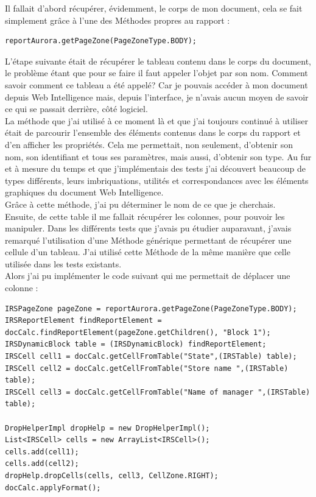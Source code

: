 Il fallait d'abord r\'{e}cup\'{e}rer, \'{e}videmment, le corps de mon document, cela se fait simplement gr\^{a}ce \`{a} l'une des M\'{e}thodes propres au rapport :
\begin{lstlisting}
reportAurora.getPageZone(PageZoneType.BODY);
\end{lstlisting}
L'\'{e}tape suivante \'{e}tait de r\'{e}cup\'{e}rer le tableau contenu dans le corps du document, le probl\`{e}me \'{e}tant que pour se faire il faut appeler l'objet par son nom. Comment savoir comment ce tableau a \'{e}t\'{e} appel\'{e}? Car je pouvais acc\'{e}der \`{a} mon document depuis Web Intelligence mais, depuis l'interface, je n'avais aucun moyen de savoir ce qui se passait derri\`{e}re, c\^{o}t\'{e} logiciel.\\
La m\'{e}thode que j'ai utilis\'{e} \`{a} ce moment l\`{a} et que j'ai toujours continu\'{e} \`{a} utiliser \'{e}tait de parcourir l'ensemble des \'{e}l\'{e}ments contenus dans le corps du rapport et d'en afficher les propri\'{e}t\'{e}s. Cela me permettait, non seulement, d'obtenir son nom, son identifiant et tous ses param\`{e}tres, mais aussi, d'obtenir son type. Au fur et \`{a} mesure du temps et que j'impl\'{e}mentais des tests j'ai d\'{e}couvert beaucoup de types diff\'{e}rents, leurs imbriquations, utilit\'{e}s et correspondances avec les \'{e}l\'{e}ments graphiques du document Web Intelligence.\\
Gr\^{a}ce \`{a} cette m\'{e}thode, j'ai pu d\'{e}terminer le nom de ce que je cherchais.\\
Ensuite, de cette table il me fallait r\'{e}cup\'{e}rer les colonnes, pour pouvoir les manipuler. Dans les diff\'{e}rents tests que j'avais pu \'{e}tudier auparavant, j'avais remarqu\'{e} l'utilisation d'une M\'{e}thode g\'{e}n\'{e}rique permettant de r\'{e}cup\'{e}rer une cellule d'un tableau. J'ai utilis\'{e} cette M\'{e}thode de la m\^{e}me mani\`{e}re que celle utilis\'{e}e dans les tests existants. \\
Alors j'ai pu impl\'{e}menter le code suivant qui me permettait de d\'{e}placer une colonne :


\begin{lstlisting}
IRSPageZone pageZone = reportAurora.getPageZone(PageZoneType.BODY);
IRSReportElement findReportElement = docCalc.findReportElement(pageZone.getChildren(), "Block 1");
IRSDynamicBlock table = (IRSDynamicBlock) findReportElement;
IRSCell cell1 = docCalc.getCellFromTable("State",(IRSTable) table);
IRSCell cell2 = docCalc.getCellFromTable("Store name ",(IRSTable) table);
IRSCell cell3 = docCalc.getCellFromTable("Name of manager ",(IRSTable) table);

DropHelperImpl dropHelp = new DropHelperImpl();
List<IRSCell> cells = new ArrayList<IRSCell>();
cells.add(cell1);
cells.add(cell2);
dropHelp.dropCells(cells, cell3, CellZone.RIGHT);
docCalc.applyFormat();
\end{lstlisting}

